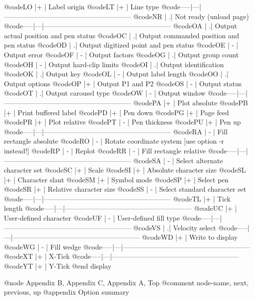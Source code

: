 @code{LO   |+  | Label origin}
@code{LT   |+  | Line type}
@code{-----|---|--------------------------------------------------------}
@code{NR   |  .| Not ready (unload page)}
@code{-----|---|--------------------------------------------------------}
@code{OA   |  .| Output actual position and pen status}
@code{OC   |  .| Output commanded position and pen status}
@code{OD   |  .| Output digitized point and pen status}
@code{OE   | - | Output error}
@code{OF   | - | Output factors}
@code{OG   |  .| Output group count}
@code{OH   | - | Output hard-clip limits}
@code{OI   |  .| Output identification}
@code{OK   |  .| Output key}
@code{OL   | - | Output label length}
@code{OO   |  .| Output options}
@code{OP   |+  | Output P1 and P2}
@code{OS   | - | Output status}
@code{OT   |  .| Output carousel type}
@code{OW   | - | Output window}
@code{-----|---|--------------------------------------------------------}
@code{PA   |+  | Plot absolute}
@code{PB   |+  | Print buffered label}
@code{PD   |+  | Pen down}
@code{PG   |+  | Page feed}
@code{PR   |+  | Plot relative}
@code{PT   | - | Pen thickness}
@code{PU   |+  | Pen up}
@code{-----|---|--------------------------------------------------------}
@code{RA   | - | Fill rectangle absolute}
@code{RO   | - | Rotate coordinate system  [use option -r instead!]}
@code{RP   | - | Replot}
@code{RR   | - | Fill rectangle relative}
@code{-----|---|--------------------------------------------------------}
@code{SA   | - | Select alternate character set}
@code{SC   |+  | Scale}
@code{SI   |+  | Absolute character size}
@code{SL   |+  | Character slant}
@code{SM   |+  | Symbol mode}
@code{SP   |+  | Select pen}
@code{SR   |+  | Relative character size}
@code{SS   | - | Select standard character set}
@code{-----|---|--------------------------------------------------------}
@code{TL   |+  | Tick length}
@code{-----|---|--------------------------------------------------------}
@code{UC   |+  | User-defined character}
@code{UF   | - | User-defined fill type}
@code{-----|---|--------------------------------------------------------}
@code{VS   |  .| Velocity select}
@code{-----|---|--------------------------------------------------------}
@code{WD   |+  | Write to display}
@code{WG   | - | Fill wedge}
@code{-----|---|--------------------------------------------------------}
@code{XT   |+  | X-Tick}
@code{-----|---|--------------------------------------------------------}
@code{YT   |+  | Y-Tick}
@end display



@node Appendix B, Appendix C, Appendix A, Top
@comment  node-name,  next,  previous,  up
@appendix   Option summary


